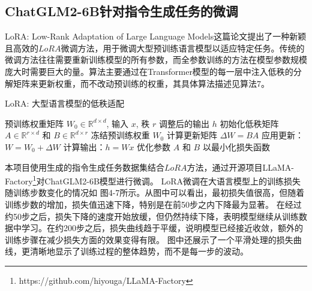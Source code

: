\documentclass[a4paper,AutoFakeBold,oneside,12pt]{book}
\begin{document}
\subsection{ChatGLM2-6B针对指令生成任务的微调}
LoRA: Low-Rank Adaptation of Large Language Models\cite{hu2021lora}这篇论文提出了一种新颖且高效的$LoRA$微调方法，用于微调大型预训练语言模型以适应特定任务。传统的微调方法往往需要重新训练模型的所有参数，而全参数训练的方法在模型参数规模庞大时需要巨大的量。算法主要通过在Transformer模型的每一层中注入低秩的分解矩阵来更新权重，而不改动预训练的权重，其具体算法描述见算法7。
\begin{algorithm}
	\begin{spacing}{1.3}
		\caption{LoRA: 大型语言模型的低秩适配} 
		\label{LoRA_model}
		\renewcommand{\algorithmicrequire}{\textbf{输入：}}
		\renewcommand{\algorithmicensure}{\textbf{输出：}} 
			\begin{algorithmic}[1] 
				\Require 预训练权重矩阵 $W_0 \in \mathbb{R}^{d \times d}$, 输入 $x$, 秩 $r$
				\Ensure 调整后的输出 $h$
				\State 初始化低秩矩阵 $A \in \mathbb{R}^{r \times d}$ 和 $B \in \mathbb{R}^{d \times r}$
				\State 冻结预训练权重 $W_0$
				    \State 计算更新矩阵 $\Delta W = BA$
				    \State 应用更新：$W = W_0 + \Delta W$
				    \State 计算输出：$h = Wx$
				\EndFor
				\State 优化参数 $A$ 和 $B$ 以最小化损失函数
			\end{algorithmic}
	\end{spacing}
\end{algorithm}


本项目使用生成的指令生成任务数据集结合$LoRA$方法，通过开源项目LLaMA-Factory\footnote{https://github.com/hiyouga/LLaMA-Factory}对ChatGLM2-6B模型进行微调。
LoRA微调在大语言模型上的训练损失随训练步数变化的情况如 图4-7所示。从图中可以看出，最初损失值很高，但随着训练步数的增加，损失值迅速下降，特别是在前50步之内下降最为显著。
在经过约50步之后，损失下降的速度开始放缓，但仍然持续下降，表明模型继续从训练数据中学习。在约200步之后，损失曲线趋于平缓，说明模型已经接近收敛，额外的训练步骤在减少损失方面的效果变得有限。
图中还展示了一个平滑处理的损失曲线，更清晰地显示了训练过程的整体趋势，而不是每一步的波动。
\end{document}
